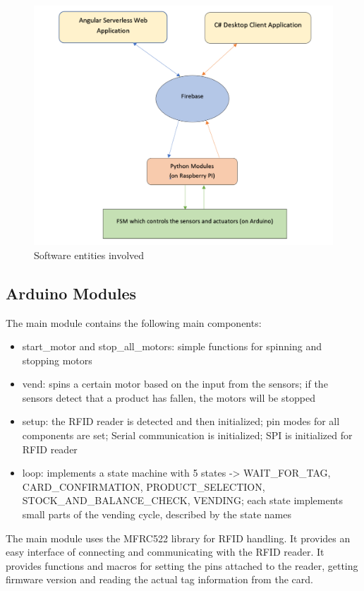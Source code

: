 \documentclass[a4paper,11pt]{article}
\begin{document}
\begin{figure}[h]
\centering
\includegraphics[scale=0.9]{SWArchitecture.png}
\caption{Software entities involved}
\label{fig:soft-design}
\end{figure}

\subsection{Arduino Modules}
The main module contains the following main components:

\begin{itemize}
\item start\_motor and stop\_all\_motors: simple functions for spinning and stopping motors
\item vend: spins a certain motor based on the input from the sensors; if the sensors detect that a product has fallen, the motors will be stopped
\item setup: the RFID reader is detected and then initialized; pin modes for all components are set; Serial communication is initialized; SPI is initialized for RFID reader
\item loop: implements a state machine with 5 states -> WAIT\_FOR\_TAG,  CARD\_CONFIRMATION, PRODUCT\_SELECTION, STOCK\_AND\_BALANCE\_CHECK, VENDING; each state implements small parts of the vending cycle, described by the state names\\
\end{itemize}

The main module uses the MFRC522 library for RFID handling. It provides an easy interface of connecting and communicating with the RFID reader. It provides functions and macros for 
setting the pins attached to the reader, getting firmware version and reading the actual tag information from the card.
\end{document}
